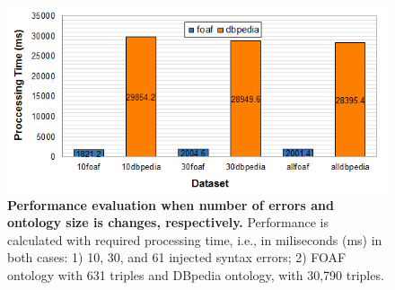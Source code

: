 \begin{figure}[ht]
\begin{center}
		\includegraphics[scale=0.7,angle=0]{images/Experiment03-03.png}
		\setlength\belowcaptionskip{-5mm}
		\setlength\abovecaptionskip{0mm}
		\caption{\textbf{Performance evaluation when number of errors and ontology size is changes, respectively.} 
		Performance is calculated with required processing time, i.e., in miliseconds (ms) in both cases: 1) 10, 30, and 61 injected syntax errors; 2) FOAF ontology with 631 triples and DBpedia ontology, with 30,790 triples.}
\label{Fig:Experiment03-03}

\end{center}
\end{figure}
